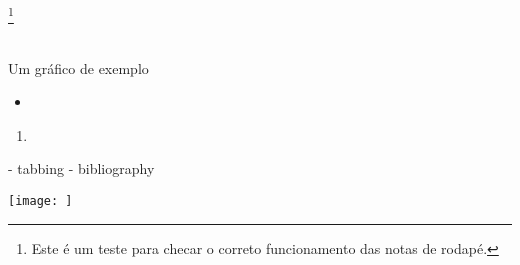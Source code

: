 %
%
%
%
%


\footnote{Este é um teste para checar o correto funcionamento das notas de rodapé.}

\chapter{}

\section{}

\subsection{}

\subsubsection{}
\addtocounter{secnumdepth}{1}

\paragraph{}

\subparagraph{}

\begin{grafico}[!hbt]
  \centering
  \caption{Um gráfico de exemplo}
  \label{grafico-exemplo}
\end{grafico}

\begin{itemize}
  \item
\end{itemize}

\begin{enumerate}
  \item
\end{enumerate}

\begin{description}
  \item[]
\end{description}

- tabbing
- bibliography
\=
\\
\>

\texttt{[image: ]}

\cite{ckey}

\nocite{*}
